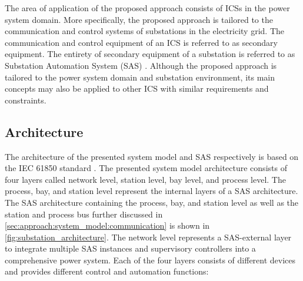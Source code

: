 The area of application of the proposed approach consists of ICSs in the power system domain.
More specifically, the proposed approach is tailored to the communication and control systems of substations in the electricity grid.
The communication and control equipment of an ICS is referred to as secondary equipment.
The entirety of secondary equipment of a substation is referred to as Substation Automation System (SAS) \cite{Padilla2015}.
Although the proposed approach is tailored to the power system domain and substation environment, its main concepts may also be applied to other ICS with similar requirements and constraints.

\subsection{Architecture}
The architecture of the presented system model and SAS respectively is based on the IEC 61850 standard \cite{IEC61850P5}.
The presented system model architecture consists of four layers called network level, station level, bay level, and process level.
The process, bay, and station level represent the internal layers of a SAS architecture.
The SAS architecture containing the process, bay, and station level as well as the station and process bus further discussed in \autoref{sec:approach:system_model:communication} is shown in \autoref{fig:substation_architecture}.
The network level represents a SAS-external layer to integrate multiple SAS instances and supervisory controllers into a comprehensive power system.
Each of the four layers consists of different devices and provides different control and automation functions:
